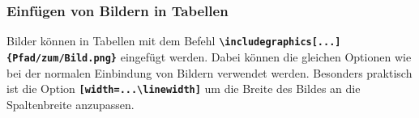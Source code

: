 \begin{table}[H]
    \centering
    \caption{Beispiel Zeilen oder Spalten verbinden}
    \label{tab:example_multirow_multicolumn}
\end{table}


\subsubsection{Einfügen von Bildern in Tabellen}
Bilder können in Tabellen mit dem Befehl \textbf{\texttt{\textbackslash includegraphics[...]\{Pfad/zum/Bild.png\}}} eingefügt werden. Dabei können die gleichen Optionen wie bei der normalen Einbindung von Bildern verwendet werden. Besonders praktisch ist die Option \textbf{\texttt{[width=...\textbackslash linewidth]}} um die Breite des Bildes an die Spaltenbreite anzupassen.

